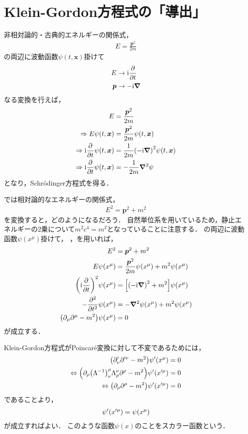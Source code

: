 \documentclass{report}
\begin{document}
  \section{Klein-Gordon方程式の「導出」}
    非相対論的・古典的エネルギーの関係式，
    \begin{align}
      E = \frac{\bm{p}^2}{2m}
    \end{align}
    の両辺に波動函数$\psi(t, \bm{x})$掛けて
    \begin{align}
      E &\to \mathrm{i}\pdv{t} \label{energy-to-diff}\\ 
      \bm{p} &\to -\mathrm{i}\grad \label{momentum-to-diff}
    \end{align}
    なる変換を行えば，
    \begin{align}
      E &= \frac{\bm{p}^2}{2m} \\ 
      \Rightarrow E\psi(t, \bm{x}) &= \frac{\bm{p}^2}{2m}\psi(t, \bm{x}) \\ 
      \Rightarrow \mathrm{i}\pdv{t}\psi(t, \bm{x}) &= \frac{1}{2m}\qty(-\mathrm{i}\grad)^2\psi(t, \bm{x}) \\ 
      \Rightarrow \mathrm{i}\pdv{t}\psi(t, \bm{x}) &= -\frac{1}{2m}\grad^2\psi
    \end{align}
    となり，Schr\"odinger方程式を得る．
    \par
    では相対論的なエネルギーの関係式，
    \begin{align}
      E^2 = \bm{p}^2 + m^2\label{relativity-energy}
    \end{align}
    を変換すると，どのようになるだろう．
    自然単位系を用いているため，静止エネルギーの2乗について$m^2c^4 = m^2$となっていることに注意する．
    の両辺に波動函数$\psi(x^{\mu})$掛けて，
    ，を用いれば，
    \begin{align}
      E^2 &= \bm{p}^2 + m^2 \\ 
      E\psi(x^{\mu}) &= \frac{\bm{p}^2}{2m}\psi(x^{\mu}) + m^2\psi(x^{\mu}) \\ 
      \qty(\mathrm{i}\pdv{t})^2\psi(x^{\mu}) &= \qty[\qty(-\mathrm{i}\grad)^2 + m^2]\psi(x^{\mu}) \\ 
      -\pdv[2]{t}\psi(x^{\mu}) &= -\grad^2\psi(x^{\mu}) + m^2\psi(x^{\mu}) \\ 
      \qty(\partial_{\mu}\partial^{\mu} - m^2)\psi(x^{\mu}) &= 0
    \end{align}
    が成立する．
    \par
    Klein-Gordon方程式がPoincar\'e変換に対して不変であるためには，
    \begin{align}
      \qty(\partial'_{\nu}\partial'^{\nu} - m^2)\psi'(x^{\mu}) &= 0 \\ 
      \Leftrightarrow \qty(\partial_{\rho}\qty(\Lambda^{-1})_{\nu}^{\rho}\Lambda_{\rho}^{\nu}\partial^{\rho} - m^2)\psi'(x'^{\mu}) &= 0 \\ 
      \Leftrightarrow \qty(\partial_{\rho}\partial^{\rho} - m^2)\psi'(x'^{\mu}) &= 0
    \end{align}
    であることより，
    \begin{align}
      \psi'\qty(x'^{\mu}) = \psi(x^{\mu})
    \end{align}
    が成立すればよい．
    このような函数$\psi(x)$のことをスカラー函数という．
\end{document}
